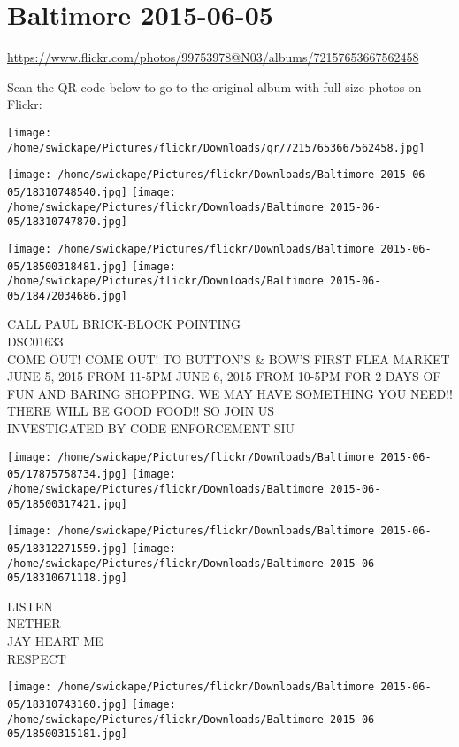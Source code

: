 \documentclass[10pt,letterpaper]{article}
\title{}
\author{}
\date{}
\begin{document}
\section*{Baltimore 2015-06-05}

\url{https://www.flickr.com/photos/99753978@N03/albums/72157653667562458}

Scan the QR code below to go to the original album with full-size photos on Flickr:

\texttt{[image: /home/swickape/Pictures/flickr/Downloads/qr/72157653667562458.jpg]}
\pagebreak

\texttt{[image: /home/swickape/Pictures/flickr/Downloads/Baltimore 2015-06-05/18310748540.jpg]}
\texttt{[image: /home/swickape/Pictures/flickr/Downloads/Baltimore 2015-06-05/18310747870.jpg]}

\texttt{[image: /home/swickape/Pictures/flickr/Downloads/Baltimore 2015-06-05/18500318481.jpg]}
\texttt{[image: /home/swickape/Pictures/flickr/Downloads/Baltimore 2015-06-05/18472034686.jpg]}

CALL PAUL BRICK{-}BLOCK POINTING\\
DSC01633\\
COME OUT!  COME OUT!  TO BUTTON'S \& BOW'S FIRST FLEA MARKET JUNE 5, 2015 FROM 11{-}5PM JUNE 6, 2015 FROM 10{-}5PM FOR 2 DAYS OF FUN AND BARING SHOPPING.  WE MAY HAVE SOMETHING YOU NEED!! THERE WILL BE GOOD FOOD!! SO JOIN US\\
INVESTIGATED BY CODE ENFORCEMENT SIU
\pagebreak

\texttt{[image: /home/swickape/Pictures/flickr/Downloads/Baltimore 2015-06-05/17875758734.jpg]}
\texttt{[image: /home/swickape/Pictures/flickr/Downloads/Baltimore 2015-06-05/18500317421.jpg]}

\texttt{[image: /home/swickape/Pictures/flickr/Downloads/Baltimore 2015-06-05/18312271559.jpg]}
\texttt{[image: /home/swickape/Pictures/flickr/Downloads/Baltimore 2015-06-05/18310671118.jpg]}

LISTEN\\
NETHER\\
JAY HEART ME\\
RESPECT
\pagebreak

\texttt{[image: /home/swickape/Pictures/flickr/Downloads/Baltimore 2015-06-05/18310743160.jpg]}
\texttt{[image: /home/swickape/Pictures/flickr/Downloads/Baltimore 2015-06-05/18500315181.jpg]}
\end{document}
